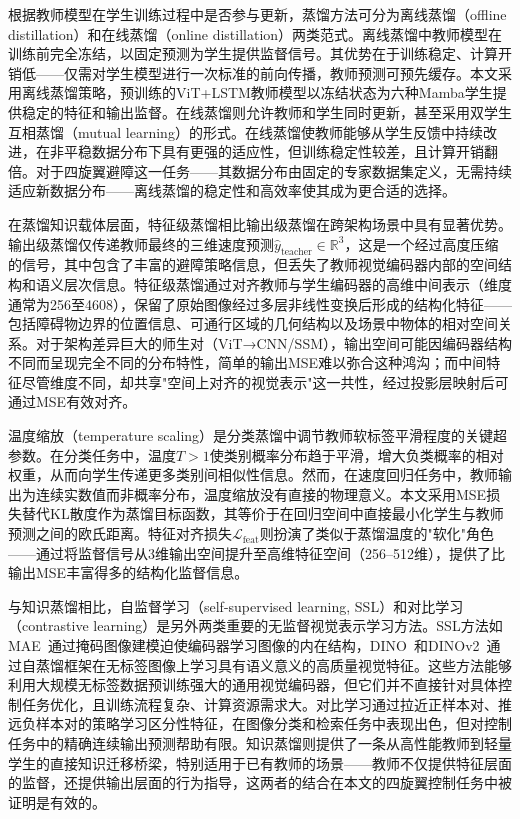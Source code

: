 \documentclass[12pt,a4paper]{article}
\numberwithin{equation}{section}
\numberwithin{figure}{section}
\numberwithin{table}{section}
\begin{document}
根据教师模型在学生训练过程中是否参与更新，蒸馏方法可分为离线蒸馏（offline distillation）和在线蒸馏（online distillation）两类范式。离线蒸馏中教师模型在训练前完全冻结，以固定预测为学生提供监督信号。其优势在于训练稳定、计算开销低——仅需对学生模型进行一次标准的前向传播，教师预测可预先缓存。本文采用离线蒸馏策略，预训练的ViT+LSTM教师模型以冻结状态为六种Mamba学生提供稳定的特征和输出监督。在线蒸馏则允许教师和学生同时更新，甚至采用双学生互相蒸馏（mutual learning）的形式。在线蒸馏使教师能够从学生反馈中持续改进，在非平稳数据分布下具有更强的适应性，但训练稳定性较差，且计算开销翻倍。对于四旋翼避障这一任务——其数据分布由固定的专家数据集定义，无需持续适应新数据分布——离线蒸馏的稳定性和高效率使其成为更合适的选择。

在蒸馏知识载体层面，特征级蒸馏相比输出级蒸馏在跨架构场景中具有显著优势。输出级蒸馏仅传递教师最终的三维速度预测$\hat{y}_{\text{teacher}} \in \mathbb{R}^3$，这是一个经过高度压缩的信号，其中包含了丰富的避障策略信息，但丢失了教师视觉编码器内部的空间结构和语义层次信息。特征级蒸馏通过对齐教师与学生编码器的高维中间表示（维度通常为256至4608），保留了原始图像经过多层非线性变换后形成的结构化特征——包括障碍物边界的位置信息、可通行区域的几何结构以及场景中物体的相对空间关系。对于架构差异巨大的师生对（ViT→CNN/SSM），输出空间可能因编码器结构不同而呈现完全不同的分布特性，简单的输出MSE难以弥合这种鸿沟；而中间特征尽管维度不同，却共享"空间上对齐的视觉表示"这一共性，经过投影层映射后可通过MSE有效对齐。

温度缩放（temperature scaling）是分类蒸馏中调节教师软标签平滑程度的关键超参数。在分类任务中，温度$T > 1$使类别概率分布趋于平滑，增大负类概率的相对权重，从而向学生传递更多类别间相似性信息。然而，在速度回归任务中，教师输出为连续实数值而非概率分布，温度缩放没有直接的物理意义。本文采用MSE损失替代KL散度作为蒸馏目标函数，其等价于在回归空间中直接最小化学生与教师预测之间的欧氏距离。特征对齐损失$\mathcal{L}_{\text{feat}}$则扮演了类似于蒸馏温度的"软化"角色——通过将监督信号从$3$维输出空间提升至高维特征空间（256--512维），提供了比输出MSE丰富得多的结构化监督信息。

与知识蒸馏相比，自监督学习（self-supervised learning, SSL）和对比学习（contrastive learning）是另外两类重要的无监督视觉表示学习方法。SSL方法如MAE~\cite{he2022mae}通过掩码图像建模迫使编码器学习图像的内在结构，DINO~\cite{caron2021dino}和DINOv2~\cite{oquab2023dinov2}通过自蒸馏框架在无标签图像上学习具有语义意义的高质量视觉特征。这些方法能够利用大规模无标签数据预训练强大的通用视觉编码器，但它们并不直接针对具体控制任务优化，且训练流程复杂、计算资源需求大。对比学习通过拉近正样本对、推远负样本对的策略学习区分性特征，在图像分类和检索任务中表现出色，但对控制任务中的精确连续输出预测帮助有限。知识蒸馏则提供了一条从高性能教师到轻量学生的直接知识迁移桥梁，特别适用于已有教师的场景——教师不仅提供特征层面的监督，还提供输出层面的行为指导，这两者的结合在本文的四旋翼控制任务中被证明是有效的。
\end{document}
